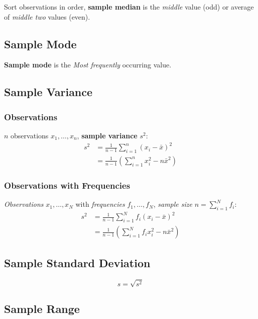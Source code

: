 Sort observations in order, \textbf{sample median} is the \textit{middle} value (odd) or average of \textit{middle two} values (even).

\subsection*{Sample Mode}

\textbf{Sample mode} is the \textit{Most frequently} occurring value.

\subsection*{Sample Variance}

\subsubsection*{Observations}

$n$ observations $x_1, \dots, x_n$, \textbf{sample variance} $s^2$:
\begin{align*}
    s^2
    &= \frac{1}{n - 1} \sum \limits_{i = 1}^{n} \left( x_i - \bar{x} \right)^2 \\
    &= \frac{1}{n - 1} \left( \sum \limits_{i = 1}^{n} x_i^2 - n \bar{x}^2 \right)
\end{align*}

\subsubsection*{Observations with Frequencies}

\textit{Observations} $x_1, \dots, x_N$ with \textit{frequencies} $f_1, \dots, f_N$, \textit{sample size} $n = \sum \nolimits_{i=1}^{N} f_i$:
\begin{align*}
    s^2
    &= \frac{1}{n - 1} \sum \limits_{i = 1}^{N} f_i \left( x_i - \bar{x} \right)^2 \\
    &= \frac{1}{n - 1} \left( \sum \limits_{i = 1}^{N} f_i x_i^2 - n \bar{x}^2 \right)
\end{align*}

\subsection*{Sample Standard Deviation}

\begin{equation*}
    s = \sqrt{s^2}
\end{equation*}

\subsection*{Sample Range}

